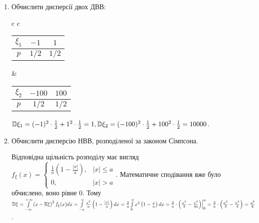 \begin{example}
    \begin{enumerate}
        \item Обчислити дисперсії двох ДВВ:
        
        \begin{tabular}{c c}
            \begin{tabular}{|c|c|c|}
                \hline
                $\xi_1$ & $-1$ & $1$ \\ 
                \hline
                $p$ & $1/2$ & $1/2$ \\
                \hline
            \end{tabular} &
            \begin{tabular}{|c|c|c|}
                \hline
                $\xi_2$ & $-100$ & $100$ \\ 
                \hline
                $p$ & $1/2$ & $1/2$ \\
                \hline
            \end{tabular}
        \end{tabular}
        
        $\mathbb{D}\xi_1 = (-1)^2\cdot \frac{1}{2} + 1^2\cdot \frac{1}{2} = 1, \mathbb{D}\xi_2 = (-100)^2\cdot \frac{1}{2} + 100^2\cdot \frac{1}{2} = 10000$.
        \item Обчислити дисперсію НВВ, розподіленої за законом Сімпсона.
        
        Відповідна щільність розподілу має вигляд $f_\xi(x) = \begin{cases}
            \frac{1}{a} \left(1 - \frac{|x|}{a}\right), & |x| \leq a \\
            0, & |x| > a
        \end{cases}$.
        Математичне сподівання вже було обчислено, воно рівне 0. Тому $\mathbb{D}\xi = \int\limits_{-\infty}^{+\infty} \left(x-\mathbb{E}\xi\right)^2 f_\xi(x)dx =
        \int\limits_{-a}^a \frac{x^2}{a}\left(1 - \frac{|x|}{a}\right)dx = \frac{2}{a}\int\limits_0^a {x^2}\left(1 - \frac{x}{a}\right)dx =
        \frac{2}{a}\cdot \left( \frac{x^3}{3} - \frac{x^4}{4a}\right)\Bigr\vert_0^a = \frac{2}{a} \cdot \left( \frac{a^3}{3} - \frac{a^3}{4}\right) = \frac{a^2}{6}$.
    \end{enumerate}
\end{example}

